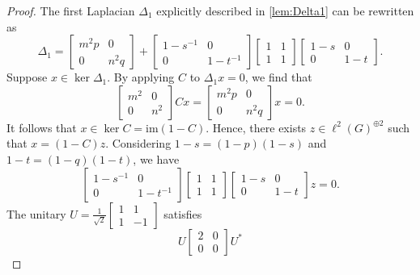 \documentclass[a4paper,leqno,12pt]{article}
\numberwithin{equation}{section}
\theoremstyle{plain}
\theoremstyle{definition}
\theoremstyle{remark}
\begin{document}
	\begin{proof}
		The first Laplacian $\Delta_1$ explicitly described in \ref{lem:Delta1} can be rewritten as 
		\[
			\Delta_1 = 
			\begin{bmatrix}m^2p & 0\\0 & n^2q 
			\end{bmatrix}
			+
			\begin{bmatrix} {1-s^{-1}} & 0 \\ 0 & {1-t^{-1}}\end{bmatrix}\begin{bmatrix}1 & 1 \\ 1 & 1\end{bmatrix}
			\begin{bmatrix}{1-s} & 0 \\ 0 & {1-t}\end{bmatrix}.
		\]
		Suppose $x\in\ker \Delta_1$. By applying $C$ to $\Delta_1x=0$, we find that 
		\[
			\begin{bmatrix}
			m^2 & 0\\
			0 & n^2
			\end{bmatrix} Cx =
			\begin{bmatrix}
				m^2p & 0\\0 & n^2q 
		\end{bmatrix} x=0.
		\]
		It follows that $x\in \ker C=\mathrm{im}(1-C)$.
		Hence, there exists $z \in \ell^2(G) ^{\oplus 2}$ such that $x=(1-C)z$. 
		Considering $1-s=(1-p)(1-s)$ and $1-t=(1-q)(1-t)$, we have 
		\begin{equation}
			\label{eq2}
			\begin{bmatrix} {1-s^{-1}} & 0 \\ 0 & {1-t^{-1}}\end{bmatrix}\begin{bmatrix}1 & 1 \\ 1 & 1\end{bmatrix}\begin{bmatrix}{1-s} & 0 \\ 0 & 1-t \end{bmatrix}z=0.
		\end{equation}
		The unitary $U=\frac{1}{\sqrt 2}\begin{bmatrix} 1& 1\\ 1 & -1\end{bmatrix}$ satisfies  
		\[
		U\begin{bmatrix}2 & 0 \\ 0 & 0\end{bmatrix} U^*
\]
\end{proof}
\end{document}
